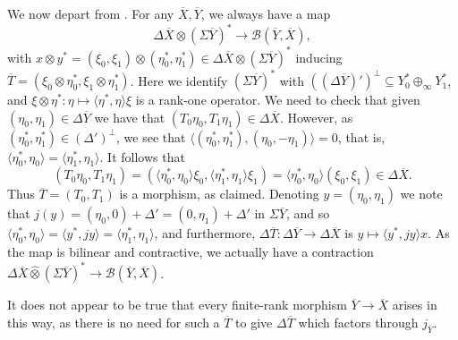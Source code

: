 \documentclass[a4paper,11pt]{article}
\theoremstyle{plain}
\theoremstyle{remark}
\newenvironment{remark}
  {\pushQED{\qed}\renewcommand{\qedsymbol}{$\triangle$}\remarkx}
  {\popQED\endremarkx}
\newcommand{\mc}[1]{\mathcal{#1}}
\newcommand{\ip}[2]{{\langle {#1} , {#2} \rangle}}
\newcommand{\proten}{\widehat\otimes}
\begin{document}
We now depart from \cite{KP_InterpolationFunctorsDuality}.
For any $\overline X, \overline Y$, we always have a map
\[ \Delta\overline X \otimes (\Sigma\overline Y)^* \to \mc B(\overline Y, \overline X), \]
with $x \otimes y^* = (\xi_0,\xi_1) \otimes (\eta_0^*,\eta_1^*) \in \Delta\overline X \otimes (\Sigma\overline Y)^*$ inducing $\overline T = (\xi_0\otimes\eta_0^*, \xi_1\otimes\eta_1^*)$.  Here we identify $(\Sigma\overline Y)^*$ with $((\Delta\overline Y)')^\perp \subseteq Y_0^* \oplus_\infty Y_1^*$, and $\xi\otimes\eta^* \colon \eta \mapsto \ip{\eta^*}{\eta} \xi$ is a rank-one operator.  We need to check that given $(\eta_0,\eta_1)\in\Delta\overline Y$ we have that $(T_0\eta_0, T_1\eta_1) \in \Delta\overline X$.  However, as $(\eta_0^*,\eta_1^*) \in (\Delta')^\perp$, we see that $\ip{(\eta_0^*,\eta_1^*)}{(\eta_0, -\eta_1)} = 0$, that is, $\ip{\eta_0^*}{\eta_0} = \ip{\eta_1^*}{\eta_1}$.  It follows that
\[ (T_0\eta_0, T_1\eta_1) = ( \ip{\eta_0^*}{\eta_0} \xi_0, \ip{\eta_1^*}{\eta_1} \xi_1 )
= \ip{\eta_0^*}{\eta_0} (\xi_0, \xi_1) \in \Delta\overline X. \]
Thus $\overline T = (T_0, T_1)$ is a morphism, as claimed.
Denoting $y = (\eta_0, \eta_1)$ we note that $j(y) = (\eta_0,0) + \Delta' = (0, \eta_1) + \Delta'$ in $\Sigma\overline Y$, and so $\ip{\eta_0^*}{\eta_0} = \ip{y^*}{jy} =\ip{\eta_1^*}{\eta_1}$, and furthermore, $\Delta \overline T \colon \Delta\overline Y \to \Delta\overline X$ is $y \mapsto \ip{y^*}{jy} x$.  As the map is bilinear and contractive, we actually have a contraction $\Delta\overline X \proten (\Sigma\overline Y)^* \to \mc B(\overline Y, \overline X)$.

\begin{remark}
It does not appear to be true that every finite-rank morphism $\overline Y \to \overline X$ arises in this way, as there is no need for such a $\overline T$ to give $\Delta \overline T$ which factors through $j_{\overline Y}$.
\end{remark}

\end{document}
